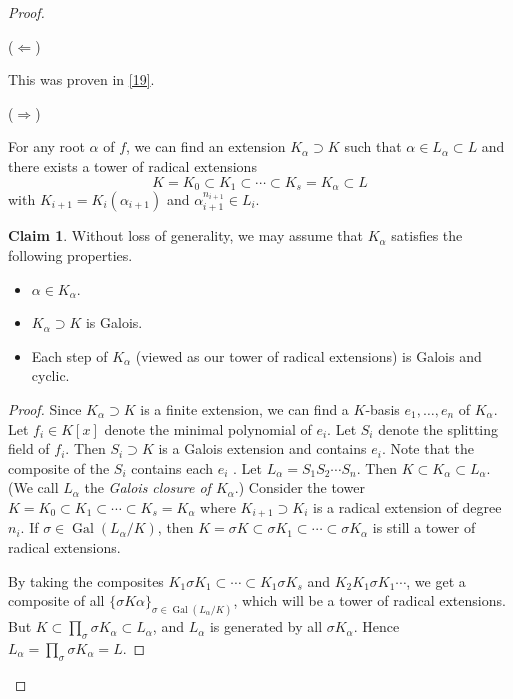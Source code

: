\documentclass[10pt,letterpaper,cm]{nupset}
\theoremstyle{definition}
\theoremstyle{theorem}
\newtheorem*{claim}{Claim}
\theoremstyle{remark}
\newcommand{\1}{\mathbf{1}}
\newcommand{\0}{\vec 0}
\DeclareMathOperator{\gal}{Gal}
\begin{document}
\begin{proof} $ $

($\Longleftarrow$) 

This was proven in \cref{19}.

\medskip

($\Longrightarrow$) 

For any root $\alpha$ of $f$, we can find an extension $K_{\alpha} \supset K$ such that  $\alpha \in L_{\alpha} \subset L$ and there exists a tower of radical extensions $$ K = K_0 \subset K_1 \subset \cdots \subset K_s = K_{\alpha} \subset L$$ with $K_{i+1} = K_i(\alpha_{i+1})$ and $\alpha_{i+1}^{n_{i+1}} \in L_i$. 
\begin{claim}
Without loss of generality, we may assume that $K_{\alpha}$ satisfies the following properties.
\begin{itemize}
\item $\alpha \in K_{\alpha}$.
\item $K_{\alpha} \supset K$ is Galois.
\item Each step of $K_{\alpha}$ (viewed as our tower of radical extensions) is Galois and cyclic. 
\end{itemize}
\end{claim}
\begin{proof}
Since $K_{\alpha}\supset K$ is a finite extension, we can find a $K$-basis $e_1, \ldots, e_n$ of $K_{\alpha}$. Let $f_i \in K[x]$ denote the minimal polynomial of $e_i$. Let $S_i$ denote the splitting field of $f_i$. Then $S_i \supset K$ is a Galois extension and contains $e_i$. Note that the composite of the $S_i$ contains each $e_i$ . Let $L_{\alpha} = S_1S_2 \cdots S_n$. Then $K \subset K_{\alpha} \subset L_{\alpha}$. (We call $L_{\alpha}$ the \textit{Galois closure of $K_{\alpha}$}.) Consider the tower $K = K_0 \subset K_1 \subset \cdots \subset K_s = K_{\alpha}$ where $K_{i+1} \supset K_i$ is a radical extension of degree $n_i$. If $\sigma \in \gal(L_{\alpha}/K)$, then $K = \sigma{K} \subset \sigma{K_1} \subset \cdots \subset \sigma{K_{\alpha}}$ is still a tower of radical extensions. 

\medskip

By taking the composites $K_1\sigma K_1 \subset \cdots \subset K_1\sigma K_s$ and $K_2K_1\sigma{K_1} \cdots$, we get  a composite of all $\{\sigma{K}{\alpha}\}_{\sigma \in \gal(L_{\alpha}/K)}$, which will be a tower of radical extensions. But $K \subset \prod_{\sigma} \sigma{K_{\alpha}} \subset L_{\alpha}$, and $L_{\alpha}$ is generated by all $\sigma{K_{\alpha}}$. Hence $L_{\alpha} = \prod_{\sigma} \sigma{K_{\alpha}} =L$.


\end{proof}
\end{proof}
\end{document}
